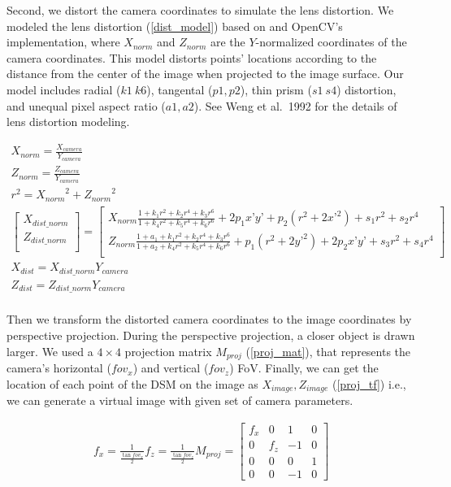 \documentclass{article}
\begin{document}
Second, we distort the camera coordinates to simulate the lens distortion. We modeled the lens distortion (\ref{dist_model}) based on \cite{Weng1992CameraCalib} and OpenCV's implementation, where \(X_{norm}\) and \(Z_{norm}\) are the \(Y\)-normalized coordinates of the camera coordinates. This model distorts points' locations according to the distance from the center of the image when projected to the image surface. Our model includes radial (\(k1~k6\)), tangental (\(p1, p2\)), thin prism (\(s1~s4\)) distortion, and unequal pixel aspect ratio (\(a1, a2\)). See Weng et al.~1992 for the details of lens distortion modeling.

\label{dist_model}
\begin{gather}
  X_{norm} = \frac{X_{camera}}{Y_{camera}} \\
  Z_{norm} = \frac{Z_{camera}}{Y_{camera}} \\
  r^2 = {X_{norm}}^2 + {Z_{norm}}^2 \\
  \begin{bmatrix}
    X_{dist\_norm} \\ 
    Z_{dist\_norm} \\
  \end{bmatrix} 
  = 
  \begin{bmatrix} 
    X_{norm} \frac{1 + k_1 r^2 + k_2 r^4 + k_3 r^6}{1 + k_4 r^2 + k_5 r^4 + k_6 r^6} + 2 p_1 x’ y’ + p_2(r^2 + 2 x’^2) + s_1 r^2 + s_2 r^4 \\ 
    Z_{norm} \frac{1 + a_1 + k_1 r^2 + k_2 r^4 + k_3 r^6}{1 + a_2 + k_4 r^2 + k_5 r^4 + k_6 r^6} + p_1 (r^2 + 2 y’^2) + 2 p_2 x’ y’ + s_3 r^2 + s_4 r^4 \\    \end{bmatrix} \\
  X_{dist} = X_{dist\_norm} Y_{camera} \\
  Z_{dist} = Z_{dist\_norm} Y_{camera} \\
\end{gather}

Then we transform the distorted camera coordinates to the image coordinates by perspective projection. During the perspective projection, a closer object is drawn larger. We used a \(4 \times 4\) projection matrix \(M_{proj}\) (\ref{proj_mat}), that represents the camera's horizontal (\(fov_x\)) and vertical (\(fov_z\)) FoV. Finally, we can get the location of each point of the DSM on the image as \(X_{image}, Z_{image}\) (\ref{proj_tf}) i.e., we can generate a virtual image with given set of camera parameters.

\label{proj_mat}
\begin{gather}
  f_x = \frac{1}{\frac{\tan fov_x}{2}} 
  f_z = \frac{1}{\frac{\tan fov_z}{2}}
  M_{proj} = 
  \begin{bmatrix} 
    f_x & 0 & 1 & 0\\ 
    0 & f_z & -1 & 0 \\ 
    0 & 0 & 0 & 1\\ 
    0 & 0 & -1 & 0 
  \end{bmatrix}
\end{gather}
\end{document}
